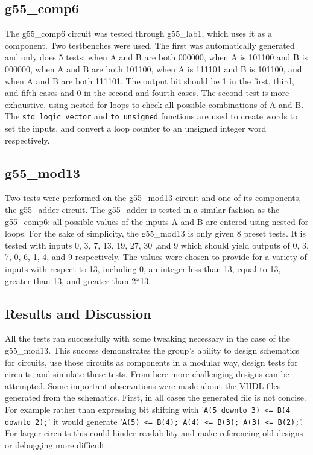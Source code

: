 \documentclass[12pt]{article}
\begin{document}
\subsection{g55\_comp6}
The g55\_comp6 circuit was tested through g55\_lab1, which uses it as a component. Two testbenches were used. The first was automatically generated and only does 5 tests: when A and B are both 000000, when A is 101100 and B is 000000, when A and B are both 101100, when A is 111101 and B is 101100, and when A and B are both 111101. The output bit should be 1 in the first, third, and fifth cases and 0 in the second and fourth cases. The second test is more exhaustive, using nested for loops to check all possible combinations of A and B. The \texttt{std\_logic\_vector} and \texttt{to\_unsigned} functions are used to create words to set the inputs, and convert a loop counter to an unsigned integer word respectively.


\subsection{g55\_mod13}
Two tests were performed on the g55\_mod13 circuit and one of its components, the g55\_adder circuit. The g55\_adder is tested in a similar fashion as the g55\_comp6: all possible values of the inputs A and B are entered using nested for loops. For the sake of simplicity, the g55\_mod13 is only given 8 preset tests. It is tested with inputs 0, 3, 7, 13, 19, 27, 30 ,and 9 which should yield outputs of 0, 3, 7, 0, 6, 1, 4, and 9 respectively. The values were chosen to provide for a variety of inputs with respect to 13, including 0, an integer less than 13, equal to 13, greater than 13, and greater than 2*13.


\subsection{Results and Discussion}
All the tests ran successfully with some tweaking necessary in the case of the g55\_mod13. This success demonstrates the group's ability to design schematics for circuits, use those circuits as components in a modular way, design tests for circuits, and simulate these tests. From here more challenging designs can be attempted. Some important observations were made about the VHDL files generated from the schematics. First, in all cases the generated file is not concise. For example rather than expressing bit shifting with '\texttt{A(5 downto 3) <= B(4 downto 2);}' it would generate '\texttt{A(5) <= B(4); A(4) <= B(3); A(3) <= B(2);}'. For larger circuits this could hinder readability and make referencing old designs or debugging more difficult.\\
\end{document}
